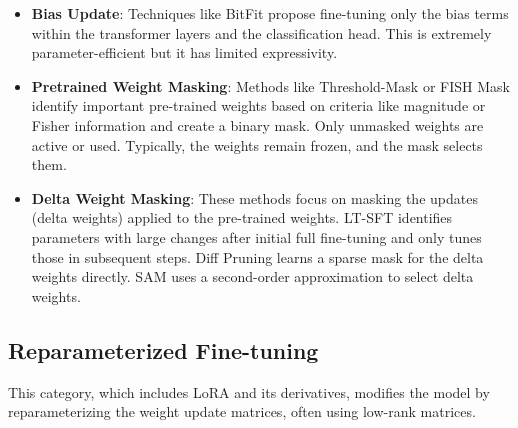 \begin{itemize}
    \item \textbf{Bias Update}: Techniques like BitFit \cite{zaken2021bitfit} propose fine-tuning only the bias terms within the transformer layers and the classification head. This is extremely parameter-efficient but it has limited expressivity. 
    \item \textbf{Pretrained Weight Masking}: Methods like Threshold-Mask \cite{Zhao_2020} or FISH Mask \cite{sung2021training} identify important pre-trained weights based on criteria like magnitude or Fisher information and create a binary mask. Only unmasked weights are active or used. Typically, the weights remain frozen, and the mask selects them.
    \item \textbf{Delta Weight Masking}: These methods focus on masking the updates (delta weights) applied to the pre-trained weights. LT-SFT \cite{Ansell_2022} identifies parameters with large changes after initial full fine-tuning and only tunes those in subsequent steps. Diff Pruning \cite{guo-etal-2021-parameter} learns a sparse mask for the delta weights directly. SAM \cite{fu2022effectiveness} uses a second-order approximation to select delta weights.
\end{itemize}

\subsection{Reparameterized Fine-tuning}
This category, which includes LoRA and its derivatives, modifies the model by reparameterizing the weight update matrices, often using low-rank matrices.

